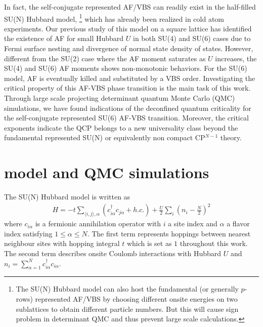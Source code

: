 \documentclass[twocolumn,superscriptaddress]{revtex4-1}
\begin{document}
In fact, the self-conjugate represented AF/VBS can readily exist in the half-filled SU(N) Hubbard model, \cite{Honerkamp2004,Assaad2005,Cai2013a,Cai2013,Wang2014b,Zhou2014} \footnote{The SU(N) Hubbard model can also host the fundamental (or generally $p$-rows) represented AF/VBS by choosing different onsite energies on two sublattices to obtain different particle numbers. But this will cause sign problem in determinant QMC and thus prevent large scale calculations.} which has already been realized in cold atom experiments. \cite{Taie2012,Zhang2014,Cazalilla2014} Our previous study\cite{Wang2014b} of this model on a square lattice has identified the existence of AF for small Hubbard $U$ in both SU(4) and SU(6) cases due to Fermi surface nesting and divergence of normal state density of states. However, different from the SU(2) case where the AF moment saturates as $U$ increases, the SU(4) and SU(6) AF moments shows non-monotonic behaviors. For the SU(6) model, AF is eventually killed and substituted by a VBS order. Investigating the critical property of this AF-VBS phase transition is the main task of this work. Through large scale projecting determinant quantum Monte Carlo (QMC) simulations, we have found indications of the deconfined quantum criticality for the self-conjugate represented SU(6) AF-VBS transition. Moreover, the critical exponents indicate the QCP belongs to a new universality class beyond the fundamental represented SU(N) or equivalently non compact CP$^{N-1}$ theory.




\section{model and QMC simulations}
The SU(N) Hubbard model is written as
\begin{eqnarray}
  H=-t\sum_{\langle i,j\rangle,\alpha}\left(c_{i\alpha}^\dag c_{j\alpha}
  +h.c.\right)+\frac{U}{2}\sum_{i}\left(n_i-\frac{N}{2}\right)^2
  \label{eq:hamilton}
\end{eqnarray}
where $c_{i\alpha}$ is a fermionic annihilation operator with $i$ a site index and $\alpha$ a flavor index satisfying $1\le\alpha\le N$. The first term represents hoppings between nearest neighbour sites with hopping integral $t$ which is set as $1$ throughout this work. The second term describes onsite Coulomb interactions with Hubbard $U$ and $n_i=\sum_{\alpha=1}^{N} c_{i\alpha}^\dag c_{i\alpha}$. 
\end{document}
